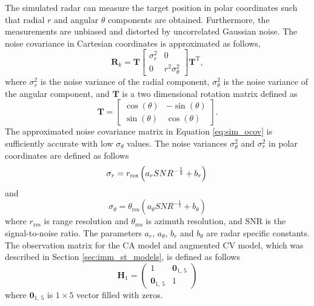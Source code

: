 \documentclass[english, 12pt, a4paper, elec, utf8, a-1b, online]{aaltothesis}
\renewcommand{\vec}[1]{\mathbf{#1}}
\newcommand{\ocov}{\vec{R}_k}
\newcommand{\transpose}[1]{#1^\text{T}}
\newcommand{\rotmat}{\mathbf{T}}
\begin{document}
The simulated radar can measure the target position in polar coordinates such that radial $r$ and angular $\theta$ components are obtained.
Furthermore, the measurements are unbiased and distorted by uncorrelated Gaussian noise.
The noise covariance in Cartesian coordinates is approximated as follows,
\begin{equation} \label{eq:sim_ocov}
    \ocov = \rotmat 
    \left[
        \begin{array}{cc}
            \sigma_r^2 & 0 \\
            0 & r^2 \sigma_\theta^2
        \end{array}
    \right] 
    \transpose{\rotmat},
\end{equation}
where $\sigma_r^2$ is the noise variance of the radial component, $\sigma_\theta^2$ is the noise variance of the angular component, and $\rotmat$ is a two dimensional rotation matrix defined as
\begin{equation}
    \rotmat = \left[
        \begin{array}{cc}
            \cos(\theta) & -\sin(\theta) \\
            \sin(\theta) & \cos(\theta)
        \end{array}
    \right].
\end{equation}
The approximated noise covariance matrix in Equation \eqref{eq:sim_ocov} is sufficiently accurate with low $\sigma_\theta$ values.
The noise variances $\sigma_\theta^2$ and $\sigma_r^2$ in polar coordinates are defined as follows
\begin{equation}
    \sigma_r =  r_\text{res}\left(a_r SNR^{-\frac{1}{2}} + b_r \right)  \label{eq:sigma_r}\\
\end{equation}
and
\begin{equation}
    \sigma_\theta =  \theta_\text{res}\left(a_\theta SNR^{-\frac{1}{2}} + b_\theta \right)\label{eq:sigma_theta}
\end{equation}
where $r_\text{res}$ is range resolution and $\theta_\text{res}$ is azimuth resolution, and SNR is the signal-to-noise ratio. 
The parameters $a_r$, $a_\theta$, $b_r$ and $b_\theta$ are radar specific constants.
The observation matrix for the CA model and augmented CV model, which was described in Section \ref{sec:imm_st_models}, is defined as follows
\begin{equation}
    \vec{H}_1 =
    \begin{pmatrix}
        1 & \vec{0}_\text{1, 5} \\
        \vec{0}_\text{1, 5} & 1
    \end{pmatrix}
\end{equation}
where $\vec{0}_\text{1, 5}$ is $1 \times 5$ vector filled with zeros.
\end{document}

